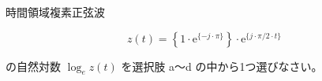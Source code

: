 \noindent 時間領域複素正弦波 

\[
z(t) =  \left \{ 1 \cdot \textrm{e}^{\{ -j \cdot \pi \}} \right \} \cdot \textrm{e}^{\{ j \cdot \pi/2 \cdot t \}}
\]

\bigskip
\noindent の自然対数 $\log_e z(t)$ を選択肢 a〜d の中から1つ選びなさい。
